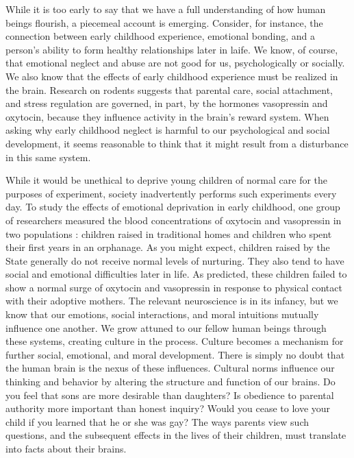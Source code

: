 \documentclass[a4paper,12pt]{extbook}
\begin{document}
While it is too early to say that we have a full understanding of how human beings flourish, a piecemeal account is emerging. 
Consider, for instance, the connection between early childhood experience, emotional bonding, and a person’s ability to form healthy relationships later in laife. 
We know, of course, that emotional neglect and abuse are not good for us, psychologically or socially. 
We also know that the effects of early childhood experience must be realized in the brain. 
Research on rodents suggests that parental care, social attachment, and stress regulation are governed, in part, by the hormones vasopressin and oxytocin, because they influence activity in the brain’s reward system. 
When asking why early childhood neglect is harmful to our psychological and social development, it seems reasonable to think that it might result from a disturbance in this same system. 

While it would be unethical to deprive young children of normal care for the purposes of experiment, society inadvertently performs such experiments every day. 
To study the effects of emotional deprivation in early childhood, one group of researchers measured the blood concentrations of oxytocin and vasopressin in two populations : 
children raised in traditional homes and children who spent their first years in an orphanage. 
As you might expect, children raised by the State generally do not receive normal levels of nurturing. 
They also tend to have social and emotional difficulties later in life. 
As predicted, these children failed to show a normal surge of oxytocin and vasopressin in response to physical contact with their adoptive mothers. 
The relevant neuroscience is in its infancy, but we know that our emotions, social interactions, and moral intuitions mutually influence one another. 
We grow attuned to our fellow human beings through these systems, creating culture in the process. 
Culture becomes a mechanism for further social, emotional, and moral development. 
There is simply no doubt that the human brain is the nexus of these influences. 
Cultural norms influence our thinking and behavior by altering the structure and function of our brains. 
Do you feel that sons are more desirable than daughters? 
Is obedience to parental authority more important than honest inquiry? 
Would you cease to love your child if you learned that he or she was gay? 
The ways parents view such questions, and the subsequent effects in the lives of their children, must translate into facts about their brains. 
\end{document}
